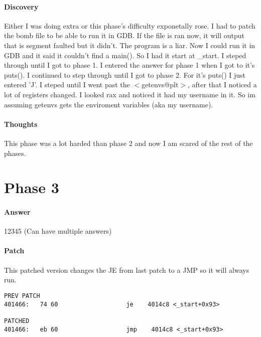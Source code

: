 \documentclass[12pt]{article}
\begin{document}
\paragraph{Discovery}
Either I was doing extra or this phase's difficulty exponetally rose. I had to patch the bomb file to be able to run it in GDB. If the file is ran now, it will output that is segment faulted but it didn't. The program is a liar. Now I could run it in GDB and it said it couldn't find a main(). So I had it start at \_start. I steped through until I got to phase 1. I entered the answer for phase 1 when I got to it's puts(). I continued to step through until I got to phase 2. For it's puts() I just entered 'J'. I steped until I went past the $<$getenvs@plt$>$, after that I noticed a lot of registers changed. I looked rax and noticed it had my username in it. So im assuming getenvs gets the enviroment variables (aka my username).

\paragraph{Thoughts}
This phase was a lot harded than phase 2 and now I am scared of the rest of the phases.

\section{Phase 3}
\paragraph{Answer}
12345 (Can have multiple answers)

\paragraph{Patch}
This patched version changes the JE from last patch to a JMP so it will always run.

\begin{verbatim}
PREV PATCH
401466:   74 60                   je    4014c8 <_start+0x93>

PATCHED
401466:   eb 60                   jmp    4014c8 <_start+0x93>
\end{verbatim}
\end{document}
